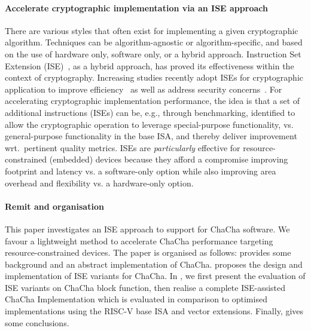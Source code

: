 \paragraph{Accelerate cryptographic implementation via an ISE approach}
There are various styles that often exist for implementing a given cryptographic algorithm. 
Techniques can be algorithm-agnostic or algorithm-specific, and based on the use of hardware only, software only, or a hybrid approach. 
Instruction Set Extension (ISE)~\cite{GalBer:11,BarGioMar:09,RegIen:16}, as a hybrid approach, has proved its effectiveness within the context of cryptography. 
Increasing studies recently adopt ISEs for cryptographic application to improve efficiency~\cite{RCB:20,MNPSW:21} as well as address security concerns~\cite{GMPP:20}. 
For accelerating cryptographic implementation performance,
the idea is that a set of additional instructions (ISEs) can be, e.g., through benchmarking, identified 
to allow the cryptographic operation to leverage special-purpose functionality, 
vs. general-purpose functionality in the base ISA, and thereby deliver improvement wrt.\ pertinent quality metrics.
ISEs are {\em particularly} effective for resource-constrained (embedded) devices 
because they afford a compromise improving footprint and latency vs. a software-only option 
while also improving area overhead and flexibility vs. a hardware-only option.

\paragraph{Remit and organisation}
This paper investigates an ISE approach to support for ChaCha software. We favour a lightweight method to accelerate ChaCha performance targeting resource-constrained devices. The paper is organised as follows:
 provides some background and an abstract implementation of ChaCha.
 proposes the design and implementation of ISE variants for ChaCha. 
In , we first present the evaluation of ISE variants on ChaCha block function, then realise a complete ISE-assisted ChaCha Implementation which is evaluated in comparison to optimised implementations using the RISC-V base ISA and vector extensions. 
Finally,  gives some conclusions.
